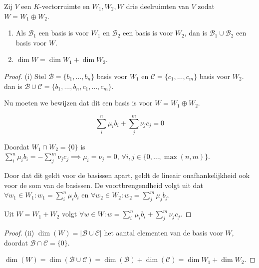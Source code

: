 \begin{stelling}[2.5.4]
    Zij $V$ een $K$-vectorruimte en $W_1, W_2, W$ drie deelruimten van $V$ zodat $W = W_1 \oplus W_2$.
    \begin{enumerate}
        \item[(i)] Als $\mathcal{B}_1$ een basis is voor $W_1$ en $\mathcal{B}_2$ een basis is voor $W_2$, dan is $\mathcal{B}_1 \cup \mathcal{B}_2$ een basis voor $W$.
        \item[(ii)] $\dim W = \dim W_1 + \dim W_2$.
    \end{enumerate}
\end{stelling}
\begin{proof}(i)
    Stel \(\mathcal{B} = \{b_1, \dots, b_n\}\) basis voor \(W_1\) en \(\mathcal{C} = \{c_1, \dots, c_m\}\) basis voor \(W_2\).
    dan is \(\mathcal{B} \cup \mathcal{C} = \{b_1, \dots, b_n,c_1, \dots, c_m\}\).

    Nu moeten we bewijzen dat dit een basis is voor \(W = W_1 \oplus W_2\).

    \[\sum_{i}^{n} \mu_i b_i + \sum_{j}^{m} \nu_j c_j  = 0\]

    Doordat \(W_1 \cap W_2 = \{0\}\) is \(\sum_{i}^{n} \mu_i b_i = -\sum_{j}^{m} \nu_j c_j \implies \mu_i = \nu_j = 0 , \,\forall i,j \in \{0,\dots,\max(n,m)\} \).

    Door dat dit geldt voor de basissen apart, geldt de lineair onafhankelijkheid ook voor de som van de basissen.
    De voortbrengendheid volgt uit dat \(\forall w_1 \in W_1: w_{1} = \sum_{i}^{n} \mu_i b_i \) en
     \(\forall w_2 \in W_2: w_{2} = \sum_{j}^{m} \mu_j b_j \).

    Uit \(W = W_1 + W_2\) volgt \(\forall w \in W: w = \sum_{i}^{n} \mu_i b_i + \sum_{j}^{m} \nu_j c_j\).
\end{proof}
\begin{proof}(ii)
    \(\dim(W)= |\mathcal{B} \cup \mathcal{C}| \) het aantal elementen van de basis voor \(W\), doordat \(\mathcal{B} \cap \mathcal{C} = \{0\}\).  
    
    \(\dim(W)=  \dim(\mathcal{B} \cup \mathcal{C}) = \dim(\mathcal{B}) + \dim(\mathcal{C}) = \dim W_1 + \dim W_2. \)
\end{proof}

